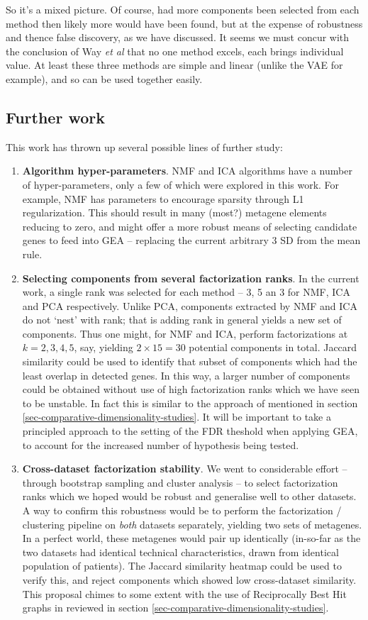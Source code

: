 \documentclass[tikz, 11pt,a4paper,oneside,fleqn]{article}
\newcommand{\etal}{{\em et al\/}}
\begin{document}
So it's a mixed picture.  Of course, had more components been selected from each method then likely more would have been found, but at the expense of robustness and thence false discovery, as we have discussed.   It seems we must concur with the conclusion of Way \etal \cite{WayGregory2019} that no one method excels, each brings individual value.   At least these three methods are simple and linear (unlike the VAE for example), and so can be used together easily.


\subsection{Further work}

This work has thrown up several possible lines of further study:
\begin{enumerate}
\item
{\bf Algorithm hyper-parameters}.  NMF and ICA algorithms have a number of hyper-parameters, only a few of which were explored in this work.  For example, NMF has parameters to encourage sparsity through L1 regularization.   This should result in many (most?) metagene elements reducing to zero, and might offer a more robust means of selecting candidate genes to feed into GEA -- replacing the current arbitrary 3 SD from the mean rule.
\item
{\bf Selecting components from several factorization ranks}.
In the current work, a single rank was selected for each method -- 3, 5 an 3 for NMF, ICA and PCA respectively.  Unlike PCA, components extracted by NMF and ICA  do not `nest' with rank; that is adding rank in general yields a new set of components.  Thus one might, for NMF and ICA, perform factorizations at $k=2,3,4,5$, say, yielding $2 \times 15 = 30$ potential components in total.  Jaccard similarity could be used to identify that subset of components which had the least overlap in detected genes.   In this way, a larger number of components could be obtained without use of high factorization ranks which we have seen to be unstable.  In fact this is similar to the approach of \cite{WayGregory2019} mentioned in section \ref{sec-comparative-dimensionality-studies}.  It will be important to take a principled approach to the setting of the FDR theshold when applying GEA, to account for the increased number of hypothesis being tested.
\item
{\bf Cross-dataset factorization stability}.  We went to considerable effort -- through bootstrap sampling and cluster analysis -- to select factorization ranks which we hoped would be robust and generalise well to other datasets.   A way to confirm this robustness would be to perform the factorization / clustering pipeline on \emph{both} datasets separately, yielding two sets of metagenes.  In a perfect world, these metagenes would pair up identically (in-so-far as the two datasets had identical technical characteristics, drawn from identical population of patients).  The Jaccard similarity heatmap could be used to verify this, and reject components which showed low cross-dataset similarity.  This proposal chimes to some extent with the use of Reciprocally Best Hit graphs in \cite{Cantini2019} reviewed in section \ref{sec-comparative-dimensionality-studies}.  

\end{enumerate}
\end{document}
